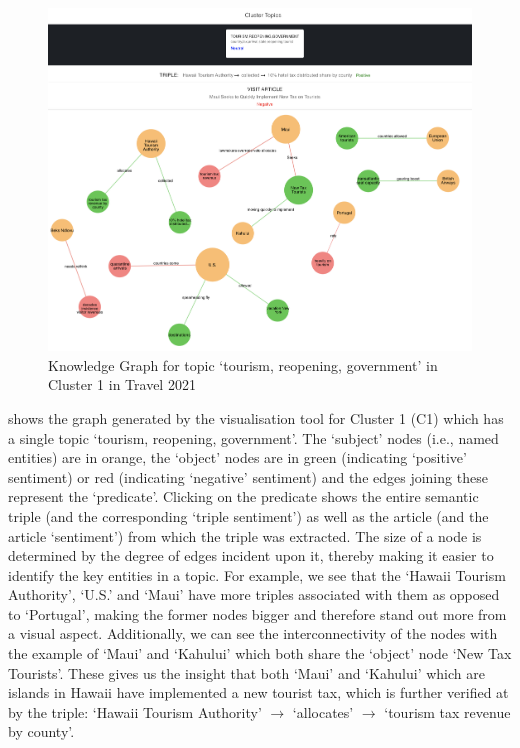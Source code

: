 \begin{figure}[H]
  \centering
  \includegraphics[width=\linewidth]{images/travel2021_triples_witha.png}
  \caption{Knowledge Graph for topic `tourism, reopening, government' in Cluster 1 in Travel 2021}
  \vspace{-1ex}
  \label{fig:triples_travel2021}
\end{figure}



 shows the graph generated by the visualisation tool for Cluster 1 (C1) which has a single topic `tourism, reopening, government'. The `subject' nodes (i.e., named entities) are in orange, the `object' nodes are in green (indicating `positive' sentiment) or red (indicating `negative' sentiment) and the edges joining these represent the `predicate'. Clicking on the predicate shows the entire semantic triple (and the corresponding `triple sentiment') as well as the article (and the article `sentiment') from which the triple was extracted. The size of a node is determined by the degree of edges incident upon it, thereby making it easier to identify the key entities in a topic. For example, we see that the `Hawaii Tourism Authority', `U.S.' and `Maui' have more triples associated with them as opposed to `Portugal', making the former nodes bigger and therefore stand out more from a visual aspect. Additionally, we can see the interconnectivity of the nodes with the example of `Maui' and `Kahului' which both share the `object' node `New Tax Tourists'. These gives us the insight that both `Maui' and `Kahului' which are islands in Hawaii have implemented a new tourist tax, which is further verified at by the triple: `Hawaii Tourism Authority' $\rightarrow$ `allocates'  $\rightarrow$ `tourism tax revenue by county'.

